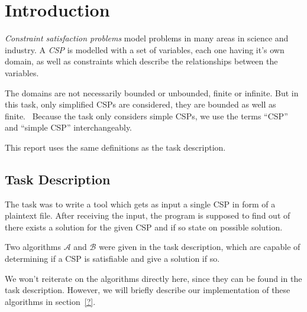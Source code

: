 \section{Introduction}

\emph{Constraint satisfaction problems} model problems in many areas in science and industry.
A \emph{CSP} is modelled with a set of variables, each one having it's own domain, as well as constraints which describe the relationships between the variables.~\cite{MF19}

The domains are not necessarily bounded or unbounded, finite or infinite.
But in this task, only simplified CSPs are considered, they are bounded as well as finite.~\cite{MF19}
Because the task only considers simple CSPs, we use the terms ``CSP'' and ``simple CSP'' interchangeably.

This report uses the same definitions as the task description.

\subsection{Task Description}

The task was to write a tool which gets as input a single CSP in form of a plaintext file.
After receiving the input, the program is supposed to find out of there exists a solution for the given CSP and if so state on possible solution.

Two algorithms $\mathcal{A}$ and $\mathcal{B}$ were given in the task description, which are capable of determining if a CSP is satisfiable and give a solution if so.

We won't reiterate on the algorithms directly here, since they can be found in the task description.
However, we will briefly describe our implementation of these algorithms in section~\ref{?}.
